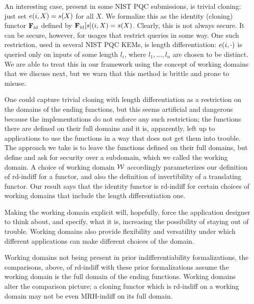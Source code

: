 An interesting case, present in some NIST PQC submissions, is trivial cloning: just set $e(i,X)=s(X)$ for all $X$. We formalize this as the identity (cloning) functor $\mathbf{F}_{\mathrm{id}}$ defined by $\mathbf{F}_{\mathrm{id}}[s](i,X) = s(X)$. Clearly, this is not always secure. It can be secure, however, for usages that restrict queries in some way. One such restriction, used in several NIST PQC KEMs, is length differentiation: $e(i,\cdot)$ is queried only on inputs of some length $l_i$, where $l_1,\ldots,l_n$ are chosen to be distinct. We are able to treat this in our framework using the concept of working domains that we discuss next, but we warn that this method is brittle and prone to misuse.






 One could capture trivial cloning with length differentiation as a restriction on the domains of the ending functions, but this seems artificial and dangerous because the implementations do not enforce any such restriction; the functions there are defined on their full domains and it is, apparently, left up to applications to use the functions in a way that does not get them into trouble. The approach we take is to leave the functions defined on their full domains, but define and ask for security over a subdomain, which we called the working domain. A choice of working domain ${\cal W}$ accordingly parameterizes our definition of rd-indiff for a functor, and also the definition of invertibility of a translating functor. Our result says that the identity functor is rd-indiff for certain choices of working domains that include the length differentiation one. 

Making the working domain explicit will, hopefully, force the application designer to think about, and specify, what it is, increasing the possibility of staying out of trouble. Working domains also provide flexibility and versatility under which different applications can make different choices of the domain.

Working domains not being present in prior indifferentiability formalizations, the comparisons, above, of rd-indiff with these prior formalizations assume the working domain is the full domain of the ending functions.  Working domains alter the comparison picture; a cloning functor which is rd-indiff on a working domain may not be even MRH-indiff on its full domain.

